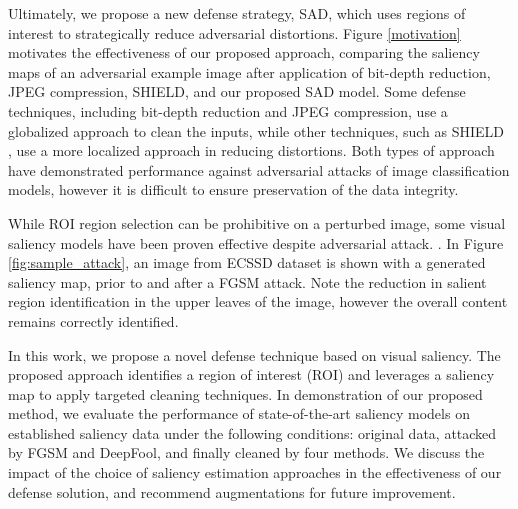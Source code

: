 \documentclass[10pt,twocolumn,letterpaper]{article}
\begin{document}
Ultimately, we propose a new defense strategy, SAD, which uses regions of interest to strategically reduce adversarial distortions.
Figure \ref{motivation} motivates the effectiveness of our proposed approach, comparing the saliency maps of an adversarial example image after application of bit-depth reduction, JPEG compression, SHIELD\cite{das2018shield}, and our proposed SAD model.
Some defense techniques, including bit-depth reduction and JPEG compression, use a globalized approach to clean the inputs, while other techniques, such as SHIELD \cite{das2018shield}, use a more localized approach in reducing distortions.
Both types of approach have demonstrated performance against adversarial attacks of image classification models, however it is difficult to ensure preservation of the data integrity.

While ROI region selection can be prohibitive on a perturbed image, some visual saliency models have been proven effective despite adversarial attack. \cite{adv_sal2019}.
In Figure \ref{fig:sample_attack}, an image from ECSSD\cite{ECSSD} dataset is shown with a generated saliency map, prior to and after a FGSM\cite{FGSM} attack.
Note the reduction in salient region identification in the upper leaves of the image, however the overall content remains correctly identified.







In this work, we propose a novel defense technique based on visual saliency.
The proposed approach identifies a region of interest (ROI) and leverages a saliency map to apply targeted cleaning techniques.
In demonstration of our proposed method, we evaluate the performance of state-of-the-art saliency models on established saliency data under the following conditions: original data, attacked by FGSM and DeepFool, and finally cleaned by four methods.
We discuss the impact of the choice of saliency estimation approaches in the effectiveness of our defense solution, and recommend augmentations for future improvement. 


%
 
\end{document}

